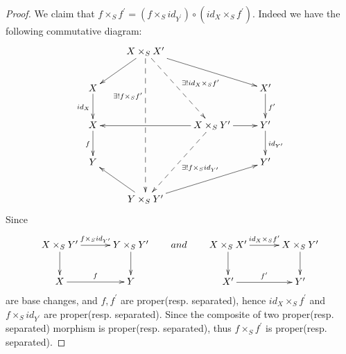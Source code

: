 \begin{proof}
We claim that $f\times_S f^{\prime}=(f\times_S id_{Y^{\prime}})\circ
(id_X\times_S f^{\prime}).$ Indeed we have the following commutative
diagram:
\[ \xymatrix{
   & {X\times_S X^{\prime}} \ar"2,1" \ar"2,4"
   \ar@{-->}"5,2"_(.3){\exists ! f\times_S f^{\prime}}
   \ar@{-->}"3,3"^{\exists ! id_X\times_S f^{\prime}}            \\
   X \ar[d]_{id_X} & & & X^{\prime} \ar[d]^{f^{\prime}}          \\
   X \ar[d]_f & & {X\times_S Y^{\prime}} \ar"3,1" \ar[r]
   \ar@{-->}"5,2"^{\exists ! f\times_S id_{Y^{\prime}}} & Y^{\prime}
   \ar[d]^{id_{Y^{\prime}}}                                      \\
   Y & & & Y^{\prime}                                            \\
   & {Y\times_S Y^{\prime}} \ar"4,1" \ar"4,4" }   \]
Since
\[ \xymatrix@C=3em{
   {X\times_S Y^{\prime}} \ar[d] \ar[r]^-{f\times_S id_{Y^{\prime}}}
   & {Y\times_S Y^{\prime}} \ar[d]                                \\
   X \ar[r]^f & Y }
\qquad and\qquad
   \xymatrix@C=3em{
   {X\times_S X^{\prime}} \ar[d] \ar[r]^-{id_X\times_S f^{\prime}}
   & {X\times_S Y^{\prime}} \ar[d]                           \\
   X^{\prime} \ar[r]^{f^{\prime}} & Y^{\prime} } \]
are base changes, and $f, f^{\prime}$ are proper(resp. separated),
hence $id_X\times_S f^{\prime}$ and $f\times_S id_{Y^{\prime}}$ are
proper(resp. separated). Since the composite of two proper(resp.
separated) morphism is proper(resp. separated), thus $f\times_S
f^{\prime}$ is proper(resp. separated).
\end{proof}
